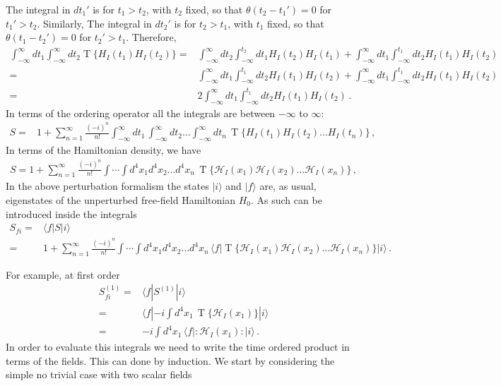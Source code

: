 The integral in $dt_1'$ is for $t_1>t_2$, with $t_2$ fixed, so that $\theta(t_2-t_1')=0$ for $t_1'>t_2$. Similarly,
The integral in $dt_2'$ is for $t_2>t_1$, with $t_1$ fixed, so that $\theta(t_1-t_2')=0$ for $t_2'>t_1$. Therefore,
\begin{align}
   \int_{-\infty}^\infty dt_1 \int_{-\infty}^{\infty}d t_2 \operatorname{T}\{H_I(t_1)H_I(t_2)\}=&
\int_{-\infty}^\infty dt_2\int_{-\infty}^{t_2}d t_1 H_I(t_2)H_I(t_1)
+\int_{-\infty}^\infty dt_1\int_{-\infty}^{t_{1}}d t_2 H_I(t_1)H_I(t_2)\nonumber\\
=&
\int_{-\infty}^\infty dt_1\int_{-\infty}^{t_1}d t_2 H_I(t_1)H_I(t_2)
+\int_{-\infty}^\infty dt_1\int_{-\infty}^{t_{1}}d t_2 H_I(t_1)H_I(t_2) \nonumber\\
=&
2\int_{-\infty}^\infty dt_1\int_{-\infty}^{t_1}d t_2 H_I(t_1)H_I(t_2)\,.
\end{align}
In terms of the ordering operator all the integrals are between $-\infty$ to $\infty$:
\begin{align}
   S=&1+\sum_{n=1}^\infty\frac{(-i)^n}{n!}\int_{-\infty}^{\infty}d t_1\,\int_{-\infty}^{\infty} d t_2\ldots\int_{-\infty}^{\infty}d t_n\,\operatorname{T}\{{H}_I(t_1){H}_I(t_2)\ldots{H}_I(t_n)\}\,, 
\end{align}
In terms of the Hamiltonian density, we have
\begin{align}
  S=1+\sum_{n=1}^\infty\frac{(-i)^n}{n!}\int\cdots\int d^4x_1 d^4x_2\ldots d^4x_n\,\operatorname{T}\{\mathcal{H}_I(x_1)\mathcal{H}_I(x_2)\ldots\mathcal{H}_I(x_n)\}\,, 
\end{align}
In the above perturbation formalism the states $|i\rangle$ and $|f\rangle$ are, as usual, eigenstates of the unperturbed free-field Hamiltonian $H_0$. As such can be introduced inside the integrals
\begin{align}
  S_{f i}=&\langle f|S|i\rangle\nonumber\\
  =&1+\sum_{n=1}^\infty\frac{(-i)^n}{n!}\int\cdots\int d^4x_1 d^4x_2\ldots d^4x_n\,\langle f|\operatorname{T}\{\mathcal{H}_I(x_1)\mathcal{H}_I(x_2)\ldots\mathcal{H}_I(x_n)\}|i\rangle\,.
\end{align}


For example, at first order
\begin{align}
  \label{eq:96f}
  S_{fi}^{(1)}=&\langle f|S^{(1)}|i\rangle\nonumber\\
  =&\langle f|-i\int d^4x_1\,\operatorname{T}\{\mathcal{H}_I(x_1)\}|i\rangle\nonumber\\
  =&-i\int d^4x_1\,\langle f|:\mathcal{H}_I(x_1):|i\rangle\,.
\end{align}
In order to evaluate this integrals we need to write the time ordered product in terms of the fields. This can done by induction. We start by considering the simple no trivial case with two scalar fields



